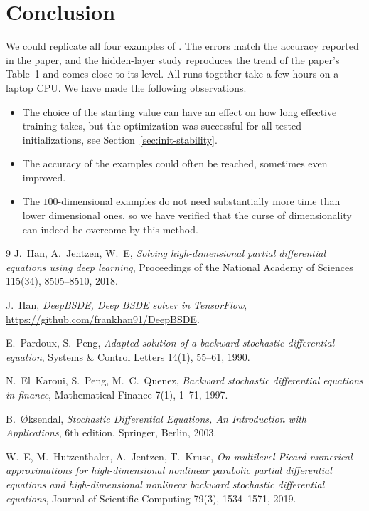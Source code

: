 ﻿\documentclass[10pt,a4paper]{article}
\begin{document}
\section{Conclusion}
\label{sec:conclusion}
We could replicate all four examples of \cite{Han2018}. The errors match the accuracy reported in the paper, and the hidden-layer study reproduces the trend of the paper's Table~1 and comes close to its level. All runs together take a few hours on a laptop CPU. We have made the following observations.
\begin{itemize}
    \item [(1)] The choice of the starting value can have an effect on how long effective training takes, but the optimization was successful for all tested initializations, see Section~\ref{sec:init-stability}.
    \item [(2)] The accuracy of the examples could often be reached, sometimes even improved.
    \item [(3)] The $100$-dimensional examples do not need substantially more time than lower dimensional ones, so we have verified that the curse of dimensionality can indeed be overcome by this method.
\end{itemize}


\begin{thebibliography}{9}
J.~Han, A.~Jentzen, W.~E,
\emph{Solving high-dimensional partial differential equations using deep
learning}, Proceedings of the National Academy of Sciences 115(34),
8505--8510, 2018.

J.~Han,
\emph{DeepBSDE, Deep BSDE solver in TensorFlow},
\url{https://github.com/frankhan91/DeepBSDE}.

E.~Pardoux, S.~Peng,
\emph{Adapted solution of a backward stochastic differential equation},
Systems \& Control Letters 14(1), 55--61, 1990.

N.~El~Karoui, S.~Peng, M.~C.~Quenez,
\emph{Backward stochastic differential equations in finance},
Mathematical Finance 7(1), 1--71, 1997.

B.~{\O}ksendal,
\emph{Stochastic Differential Equations, An Introduction with
Applications}, 6th edition, Springer, Berlin, 2003.

W.~E, M.~Hutzenthaler, A.~Jentzen, T.~Kruse,
\emph{On multilevel Picard numerical approximations for high-dimensional
nonlinear parabolic partial differential equations and high-dimensional
nonlinear backward stochastic differential equations},
Journal of Scientific Computing 79(3), 1534--1571, 2019.
\end{thebibliography}

\listoffigures
\end{document}
